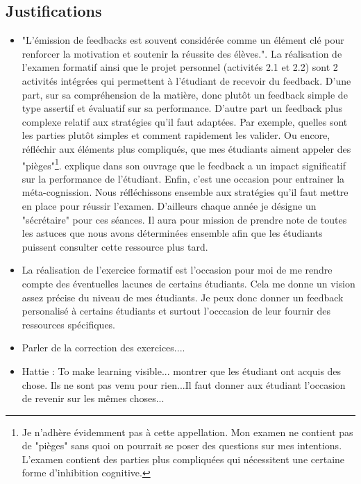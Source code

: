 \subsection{Justifications}
\label{evaluation_des_apprentissages_justifications}
\begin{itemize}
    \item "L’émission de feedbacks est souvent considérée comme un élément clé pour renforcer la motivation et soutenir la réussite des élèves."\cite{georges2011feedbacks}. La réalisation de l'examen formatif ainsi que le projet personnel (activités 2.1 et 2.2) sont 2 activités intégrées qui permettent à l’étudiant de recevoir du feedback. D'une part, sur sa compréhension de la matière, donc plutôt un feedback simple de type assertif et évaluatif \cite{georges2011feedbacks} sur sa performance. D'autre part un feedback plus complexe relatif aux stratégies qu'il faut adaptées. Par exemple, quelles sont les parties plutôt simples et comment rapidement les valider. Ou encore, réfléchir aux éléments plus compliqués, que mes étudiants aiment appeler des "pièges"\footnote{Je n'adhère évidemment pas à cette appellation. Mon examen ne contient pas de "pièges" sans quoi on pourrait se poser des questions sur mes intentions. L'examen contient des parties plus compliquées qui nécessitent une certaine forme d'inhibition cognitive.}. \citep{hattie2008visible} explique dans son ouvrage que le feedback a un impact significatif sur la performance de l'étudiant. Enfin, c'est une occasion pour entrainer la méta-cognission\cite{leclercq2008modele}. Nous réfléchissons ensemble aux stratégies qu'il faut mettre en place pour réussir l'examen. D'ailleurs chaque année je désigne un "sécrétaire" pour ces séances. Il aura pour mission de prendre note de toutes les astuces que nous avons déterminées ensemble afin que les étudiants puissent consulter cette ressource plus tard.
    \item La réalisation de l'exercice formatif est l'occasion pour moi de me rendre compte des éventuelles lacunes de certains étudiants. Cela me donne un vision assez précise du niveau de mes étudiants. Je peux donc donner un feedback personalisé à certains étudiants et surtout l'occcasion de leur fournir des ressources spécifiques.
    \item Parler de la correction des exercices....
    \item Hattie : To make learning visible... montrer que les étudiant ont acquis des chose. Ils ne sont pas venu pour rien...Il faut donner aux étudiant l'occasion de revenir sur les mêmes choses...
\end{itemize}

